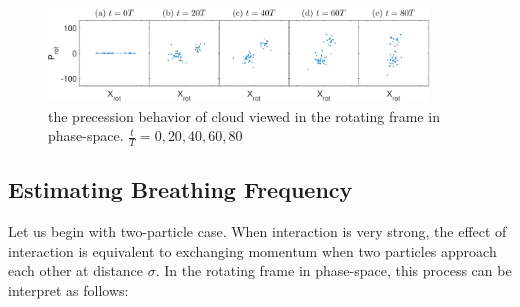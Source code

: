 \documentclass[aps,preprintnumbers,onecolumn,amsmath,amssymb,floatfix,pra]{revtex4-1}
\begin{document}
\begin{figure}
\includegraphics[width=0.9\textwidth]{ZhiyuPictures/rotating_frame_t=0-80T.eps}  
\caption{the precession behavior of cloud viewed in the rotating frame in phase-space. $\frac{t}{T}=0,20,40,60,80$}
\label{fig:Breathingfrequency2_1}
\end{figure}



\subsection{Estimating Breathing Frequency}
Let us begin with two-particle case. When interaction is very strong, the effect of interaction is equivalent to exchanging momentum when two particles approach each other at distance $\sigma$. In the rotating frame in phase-space, this process can be interpret as follows:
\end{document}
